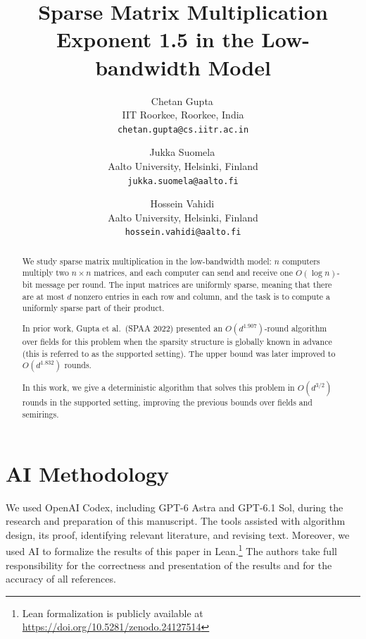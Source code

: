 \documentclass[11pt,a4paper]{article}
\title{Sparse Matrix Multiplication Exponent 1.5 in the Low-bandwidth Model}
\author{
    Chetan Gupta\,\orcidlink{0000-0002-0727-160X}\\
    IIT Roorkee, Roorkee, India\\
    \texttt{chetan.gupta@cs.iitr.ac.in}
    \and
    Jukka Suomela\,\orcidlink{0000-0001-6117-8089}\\
    Aalto University, Helsinki, Finland\\
    \texttt{jukka.suomela@aalto.fi}
    \and
    Hossein Vahidi\,\orcidlink{0000-0002-0040-1213}\\
    Aalto University, Helsinki, Finland\\
    \texttt{hossein.vahidi@aalto.fi}
}
\date{}
\begin{document}
\maketitle


\begin{abstract}
	We study sparse matrix multiplication in the low-bandwidth model: 
	$n$ computers multiply two $n\times n$ matrices, and each computer can send and receive one $O(\log n)$-bit message per round.
	The input matrices are uniformly sparse, meaning that there are at most $d$ nonzero entries in each row and column, and the task is to compute a uniformly sparse part of their product.
		
	In prior work, Gupta et al.~(SPAA 2022) presented an $O(d^{1.907})$-round algorithm over fields for this problem when the sparsity structure is globally known in advance (this is referred to as the supported setting). The upper bound was later improved to $O(d^{1.832})$ rounds.
	
	In this work, we give a deterministic algorithm that solves this problem in $O(d^{3/2})$ rounds in the supported setting, improving the previous bounds over fields and semirings.
		
		
		
		
		
\end{abstract}






%
%

\section*{AI Methodology}
We used OpenAI Codex, including GPT-6 Astra and GPT-6.1 Sol, during the research and preparation of this manuscript.
The tools assisted with algorithm design, its proof, identifying relevant
literature, and revising text. Moreover, we used AI to formalize the results of this paper in Lean.\footnote{Lean formalization is publicly available at \url{https://doi.org/10.5281/zenodo.24127514}}
The authors take full responsibility for the correctness and presentation of the results and for the accuracy of all references.




\end{document}
